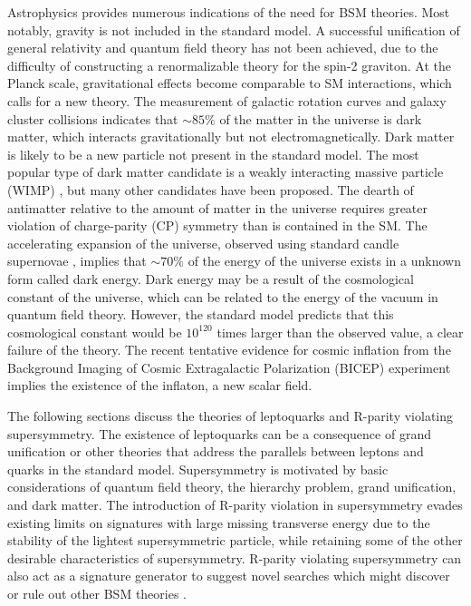 Astrophysics provides numerous indications of the need for BSM theories. Most notably, gravity is not included in the standard model. A successful unification of general relativity and quantum field theory has not been achieved, due to the difficulty of constructing a renormalizable theory for the spin-2 graviton. At the Planck scale, gravitational effects become comparable to SM interactions, which calls for a new theory. The measurement of galactic rotation curves and galaxy cluster collisions \cite{BulletCluster} indicates that ${\sim} 85\%$ of the matter in the universe is dark matter, which interacts gravitationally but not electromagnetically. Dark matter is likely to be a new particle not present in the standard model. The most popular type of dark matter candidate is a weakly interacting massive particle (WIMP) \cite{Morrissey20121}, but many other candidates have been proposed. The dearth of antimatter relative to the amount of matter in the universe requires greater violation of charge-parity (CP) symmetry than is contained in the SM. The accelerating expansion of the universe, observed using standard candle supernovae \cite{Supernova98,Supernova99}, implies that ${\sim} 70\%$ of the energy of the universe exists in a unknown form called dark energy. Dark energy may be a result of the cosmological constant of the universe, which can be related to the energy of the vacuum in quantum field theory. However, the standard model predicts that this cosmological constant would be $10^{120}$ times larger than the observed value, a clear failure of the theory. The recent tentative evidence for cosmic inflation from the Background Imaging of Cosmic Extragalactic Polarization (BICEP) experiment \cite{BICEP} implies the existence of the inflaton, a new scalar field.

The following sections discuss the theories of leptoquarks and R-parity violating supersymmetry. The existence of leptoquarks can be a consequence of grand unification or other theories that address the parallels between leptons and quarks in the standard model. Supersymmetry is motivated by basic considerations of quantum field theory, the hierarchy problem, grand unification, and dark matter. The introduction of R-parity violation in supersymmetry evades existing limits on signatures with large missing transverse energy due to the stability of the lightest supersymmetric particle, while retaining some of the other desirable characteristics of supersymmetry. R-parity violating supersymmetry can also act as a signature generator to suggest novel searches which might discover or rule out other BSM theories \cite{EvansSigGen}.

